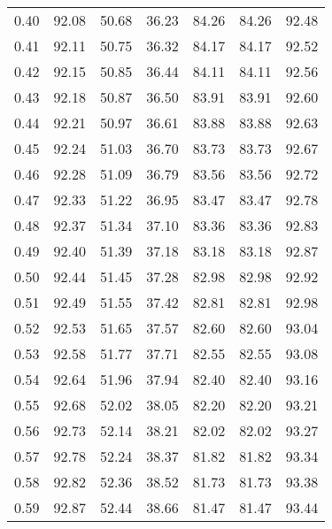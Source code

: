 \begin{tabular}{|c|c|c|c|c|c|c|}
      0.40 &     92.08 &     50.68 &      36.23 &   84.26 &      84.26 &         92.48 \\
      0.41 &     92.11 &     50.75 &      36.32 &   84.17 &      84.17 &         92.52 \\
      0.42 &     92.15 &     50.85 &      36.44 &   84.11 &      84.11 &         92.56 \\
      0.43 &     92.18 &     50.87 &      36.50 &   83.91 &      83.91 &         92.60 \\
      0.44 &     92.21 &     50.97 &      36.61 &   83.88 &      83.88 &         92.63 \\
      0.45 &     92.24 &     51.03 &      36.70 &   83.73 &      83.73 &         92.67 \\
      0.46 &     92.28 &     51.09 &      36.79 &   83.56 &      83.56 &         92.72 \\
      0.47 &     92.33 &     51.22 &      36.95 &   83.47 &      83.47 &         92.78 \\
      0.48 &     92.37 &     51.34 &      37.10 &   83.36 &      83.36 &         92.83 \\
      0.49 &     92.40 &     51.39 &      37.18 &   83.18 &      83.18 &         92.87 \\
      0.50 &     92.44 &     51.45 &      37.28 &   82.98 &      82.98 &         92.92 \\
      0.51 &     92.49 &     51.55 &      37.42 &   82.81 &      82.81 &         92.98 \\
      0.52 &     92.53 &     51.65 &      37.57 &   82.60 &      82.60 &         93.04 \\
      0.53 &     92.58 &     51.77 &      37.71 &   82.55 &      82.55 &         93.08 \\
      0.54 &     92.64 &     51.96 &      37.94 &   82.40 &      82.40 &         93.16 \\
      0.55 &     92.68 &     52.02 &      38.05 &   82.20 &      82.20 &         93.21 \\
      0.56 &     92.73 &     52.14 &      38.21 &   82.02 &      82.02 &         93.27 \\
      0.57 &     92.78 &     52.24 &      38.37 &   81.82 &      81.82 &         93.34 \\
      0.58 &     92.82 &     52.36 &      38.52 &   81.73 &      81.73 &         93.38 \\
      0.59 &     92.87 &     52.44 &      38.66 &   81.47 &      81.47 &         93.44 \\

\end{tabular}
